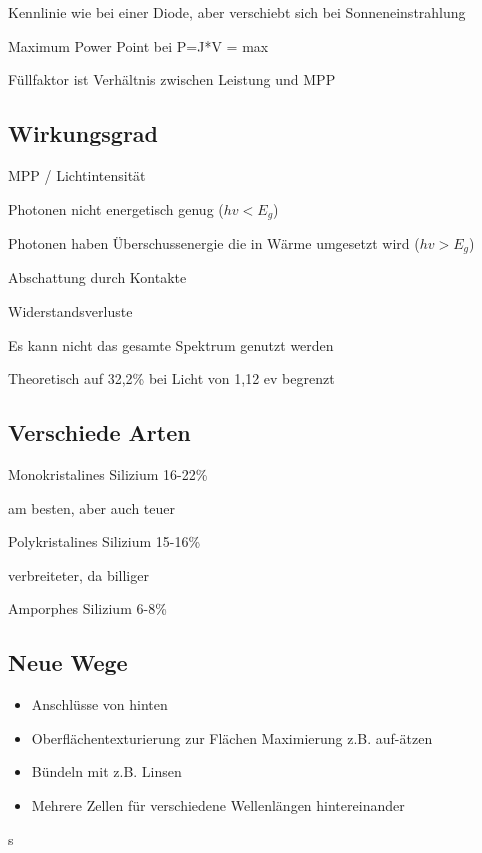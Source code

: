 Kennlinie wie bei einer Diode, aber verschiebt sich bei Sonneneinstrahlung


Maximum Power Point bei P=J*V = max

Füllfaktor ist Verhältnis zwischen Leistung und MPP


\subsection{Wirkungsgrad}

MPP / Lichtintensität

Photonen nicht energetisch genug ($hv < E_g$)

Photonen haben Überschussenergie die in Wärme umgesetzt wird ($hv > E_g$)

Abschattung durch Kontakte

Widerstandsverluste

Es kann nicht das gesamte Spektrum genutzt werden

Theoretisch auf 32,2\% bei Licht von 1,12 ev begrenzt


\subsection{Verschiede Arten}

Monokristalines Silizium 16-22\%

am besten, aber auch teuer

Polykristalines Silizium 15-16\%

verbreiteter, da billiger

Amporphes Silizium 	6-8\%


\subsection{Neue Wege}

\begin{itemize}

	\item Anschlüsse von hinten

	\item Oberflächentexturierung zur Flächen Maximierung z.B. auf-ätzen

	\item Bündeln mit z.B. Linsen

	\item Mehrere Zellen für verschiedene Wellenlängen hintereinander

\end{itemize}s






